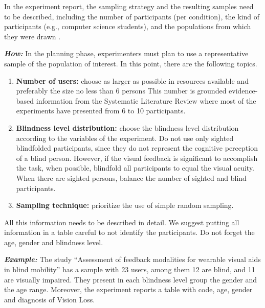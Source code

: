 In the experiment report, the sampling strategy and the resulting samples need to be described, including the number of participants (per condition), the kind of participants (e.g., computer science students), and the populations from which they were drawn \cite{Jedlitschka2007}.
\vspace{5mm}

\noindent \textit{\textbf{How:}} In the planning phase, experimenters must plan to use a representative sample of the population of interest. In this point, there are the following topics.
\begin{enumerate}
    \item \textbf{Number of users:} choose as larger as possible in resources available and preferably the size no less than 6 persons This number is grounded evidence-based information from the Systematic Literature Review where most of the experiments have presented from 6 to 10 participants.
    \item \textbf{Blindness level distribution:} choose the blindness level distribution according to the variables of the experiment. Do not use only sighted blindfolded participants, since they do not represent the cognitive perception of a blind person. However, if the visual feedback is significant to accomplish the task, when possible, blindfold all participants to equal the visual acuity. When there are sighted persons, balance the number of sighted and blind participants.
    \item \textbf{Sampling technique:} prioritize the use of simple random sampling.
\end{enumerate}

All this information needs to be described in detail. We suggest putting all information in a table careful to not identify the participants. Do not forget the age, gender and blindness level.
\vspace{5mm}

\noindent \textit{\textbf{Example:}} The study ``Assessment of feedback modalities for wearable visual aids in blind mobility''\cite{Adebiyi2017} has a sample with 23 users, among them 12 are blind, and 11 are visually impaired. They present in each blindness level group the gender and the age range. Moreover, the experiment reports a table with code, age, gender and diagnosis of Vision Loss. 
\vspace{5mm}

